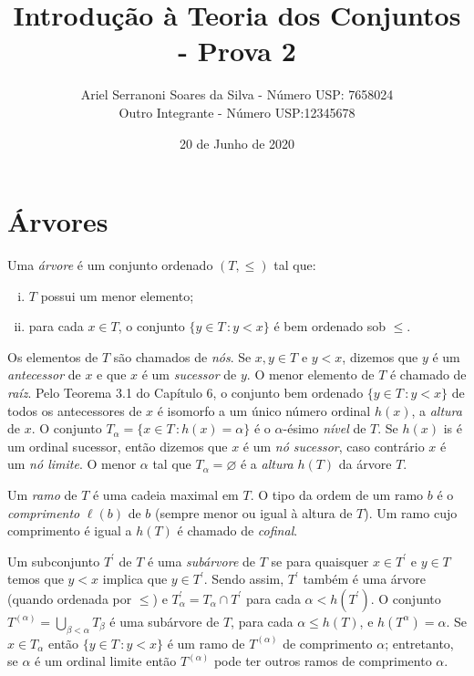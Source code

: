 \documentclass[a4paper]{article}
\title{Introdução à Teoria dos Conjuntos - Prova 2}
\author{Ariel Serranoni Soares da Silva  - Número USP: 7658024\\
Outro Integrante - Número USP:12345678}
\date{20 de Junho de 2020}
\begin{document}
\maketitle
\setcounter{section}{2}
\section{Árvores}

\begin{definition}
  Uma \emph{árvore} é um conjunto ordenado \((T,\leq)\) tal que:
  \begin{enumerate}[(i)]
  \item \(T\) possui um menor elemento;
  \item para cada \(x\in T\), o conjunto \(\{y\in T\,\colon y<x\}\) é bem
    ordenado sob \(\leq\).
  \end{enumerate}
\end{definition}

Os elementos de \(T\) são chamados de \emph{nós}. Se \(x,y\in T\) e \(y<x\),
dizemos que \(y\) é um \emph{antecessor} de \(x\) e que \(x\) é um
\emph{sucessor} de \(y\). O menor elemento de \(T\) é chamado de \emph{raíz}.
Pelo Teorema 3.1 do Capítulo 6, o conjunto bem ordenado \(\{y\in T\,\colon
y<x\}\) de todos os antecessores de \(x\) é isomorfo a um único número ordinal
\(h(x)\), a \emph{altura} de \(x\). O conjunto \(T_\alpha=\{x\in T \,\colon
h(x)=\alpha\}\) é o \(\alpha\)-ésimo \emph{nível} de \(T\). Se \(h(x)\) is é um ordinal
sucessor, então dizemos que \(x\) é um \emph{nó sucessor}, caso contrário
\(x\) é um \emph{nó limite}. O menor \(\alpha\) tal que \(T_\alpha=\varnothing\)
é a \emph{altura} \(h(T)\) da árvore \(T\). 


Um \emph{ramo} de \(T\) é uma cadeia maximal em \(T\). O tipo da ordem
de um ramo \(b\) é o \emph{comprimento} \(\ell(b)\) de \(b\) (sempre menor ou
igual à altura de \(T\)). Um ramo cujo comprimento é igual a \(h(T)\) é chamado
de \emph{cofinal}.

Um subconjunto \(T^\prime\) de \(T\) é uma \emph{subárvore} de \(T\) se para quaisquer
\(x\in T^\prime\) e \(y\in T\) temos que \(y<x\) implica que \(y\in T^\prime\).
Sendo assim, \(T^\prime\) também é uma árvore (quando ordenada por \(\leq\)) e
\(T_\alpha^\prime= T_\alpha \cap T^\prime\) para cada \(\alpha < h(T^\prime)\).
O conjunto \(T^{(\alpha)}=\bigcup_{\beta < \alpha} T_\beta\) é uma subárvore de
\(T\), para cada \(\alpha\leq h(T)\), e \(h(T^{\alpha})=\alpha\). Se \(x\in
T_\alpha\) então \(\{y\in T\,\colon y < x\}\) é um ramo de \(T^{(\alpha)}\) de
comprimento \(\alpha\); entretanto, se \(\alpha\) é um ordinal limite então
\(T^{(\alpha)}\) pode ter outros ramos de comprimento \(\alpha\).
\end{document}
